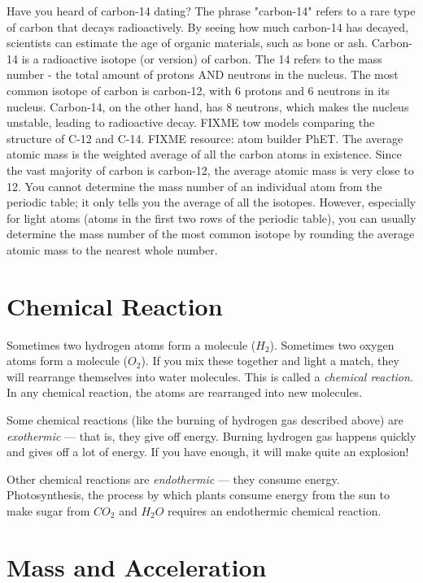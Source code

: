 Have you heard of carbon-14 dating? The phrase "carbon-14" refers to a rare
type of carbon that decays radioactively. By seeing how much carbon-14 has
decayed, scientists can estimate the age of organic materials, such as bone or
ash. Carbon-14 is a radioactive isotope (or version) of carbon. The 14 refers to
the mass number - the total amount of protons AND neutrons in the nucleus. The
most common isotope of carbon is carbon-12, with 6 protons and 6 neutrons in its
nucleus. Carbon-14, on the other hand, has 8 neutrons, which makes the nucleus
unstable, leading to radioactive decay. FIXME tow models comparing the structure
of C-12 and C-14. FIXME resource: atom builder PhET. The average atomic mass is
the weighted average of all the carbon atoms in existence. Since the vast
majority of carbon is carbon-12, the average atomic mass is very close to 12. You
cannot determine the mass number of an individual atom from the periodic table;
it only tells you the average of all the isotopes. However, especially for light
atoms (atoms in the first two rows of the periodic table), you can usually
determine the mass number of the most common isotope by rounding the average
atomic mass to the nearest whole number.

\section{Chemical Reaction}

Sometimes two hydrogen atoms form a molecule ($H_2$). Sometimes two
oxygen atoms form a molecule ($O_2$). If you mix these
together and light a match, they will rearrange themselves into water
molecules. This is called a \textit{chemical reaction}. In any
chemical reaction, the atoms are rearranged into new molecules.

Some chemical reactions (like the burning of hydrogen gas described
above) are \textit{exothermic} --- that is, they give off energy.
Burning hydrogen gas happens quickly and gives off a lot of energy. If
you have enough, it will make quite an explosion!

Other chemical reactions are \textit{endothermic} --- they consume
energy. Photosynthesis, the process by which plants consume energy
from the sun to make sugar from $CO_2$ and $H_2O$ requires an endothermic
chemical reaction.


\section{Mass and Acceleration}

